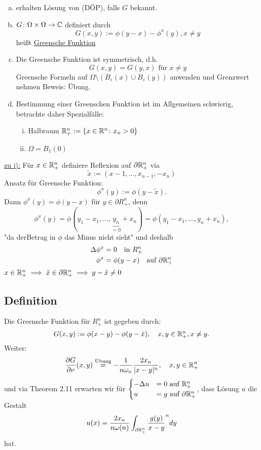 \begin{enumerate}[a)]
  \item erhalten Lösung von (DÖP), falls $G$ bekannt.
  \item $G \colon \Omega \times \Omega \to \mathbb{C}$ definiert durch 
	$$G(x,y) := \phi(y - x) - \phi^x(y), x \neq y$$
	heißt \underline{Greensche Funktion}
  \item Die Greensche Funktion ist symmetrisch, d.h.
	$$
	G(x,y) = G(y,x) \text{ für } x \neq y
	$$
	{\tiny{Greensche Formeln auf $\Omega \setminus (B_\varepsilon(x) \cup B_\varepsilon(y))$ anwenden und Grenzwert nehmen}}
	Beweis: Übung.
  \item Bestimmung einer Greenschen Funktion ist im Allgemeinen schwierig, betrachte daher Spezialfälle:
    \begin{enumerate}[i)]
      \item Halbraum $\mathbb{R}^n_+ := \{x \in \mathbb{R}^n \colon x_n > 0\}$
      \item $\Omega = B_1(0)$
    \end{enumerate}
\end{enumerate}

\underline{zu i):} Für $x \in \mathbb{R}_+^n$ definiere Reflexion auf $\partial \mathbb{R}_+^n$ via 
$$
\tilde x := (x-1, \dots, x_{n - 1}, -x_n)
$$
Ansatz für Greensche Funktion:
$$
\phi^x(y) := \phi(y - \tilde x).
$$
Dann $\phi^x(y) = \phi(y - x)$ für $y \in \partial R_+^n$, denn
$$
\phi^x(y) = \phi(y_1 - x_1, \dots, \underbrace{y_n}_{=0} + x_n) = \phi(y_1 - x_1, \dots, y_n + x_n),
$$
"da derBetrag in $\phi$ das Minus nicht sieht"
und deshalb
\begin{align*}
	\Delta \phi^x &= 0 \quad\text{in } R_+^n \\
	\phi^x &= \phi(y - x) \quad\text{auf } \partial\mathbb{R}_+^n
\end{align*}
{\tiny{$x \in \mathbb{R}_+^n \implies \tilde x \in \partial \mathbb{R}_+^n \implies y - \tilde x \neq 0$}}

\subsection{Definition}

Die Greensche Funktion für $R_+^n$ ist gegeben durch:
$$
  G(x,y) := \phi(x - y) - \phi(y - \tilde x), \quad x, y \in \mathbb{R}_+^n, x \neq y.
$$
Weiter:
$$
  \frac{\partial G}{\partial \nu}(x,y) \overset{\text{Übung}} = - \frac{1}{n \omega_n} \frac{2 x_n}{|x - y|^n}, \quad x, y \in \mathbb{R}_+^n
$$
und via Theorem 2.11 erwarten wir für $\begin{cases} -\Delta u &= 0 \text{ auf } \mathbb{R}_+^n \\ u&= g \text{ auf } \partial \mathbb{R}_+^n \end{cases}$, dass Lösung $u$ die Gestalt
$$
  u(x) = \frac{2 x_n}{n \omega(n)} \int_{\partial \mathbb{R}_+^n} \frac{g(y)}{x - y}^n dy
$$
hat.

